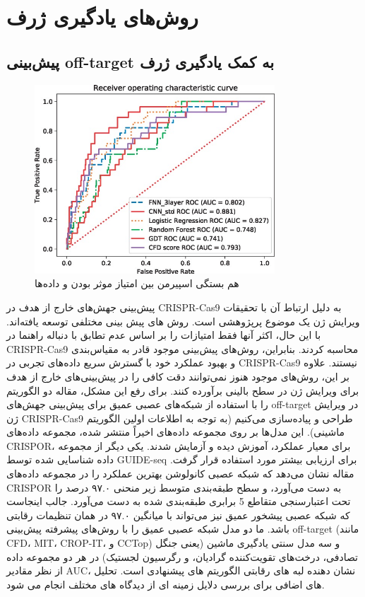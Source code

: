 \documentclass[12pt,a4paper,BCOR=.7cm,headsepline,bibliography=totoc]{report}
\begin{document}
\section{روش‌های یادگیری ژرف}
\subsection{پیش‌بینی off-target به کمک یادگیری ژرف}
\begin{figure}
\centering
\includegraphics[width=9cm, ]{pictures/DeepLearning.jpg}
\caption{
هم بستگی اسپیرمن بین امتیاز موثر بودن و داده‌ها
}\label{wrap-fig:4}
\end{figure}
پیش‌بینی جهش‌های خارج از هدف در CRISPR-Cas9 به دلیل ارتباط آن با تحقیقات ویرایش ژن یک موضوع پرپژوهشی است. روش های پیش بینی مختلفی توسعه یافته‌اند. با این حال، اکثر آنها فقط امتیازات را بر اساس عدم تطابق با دنباله راهنما در CRISPR-Cas9 محاسبه کردند. بنابراین، روش‌های پیش‌بینی موجود قادر به مقیاس‌بندی و بهبود عملکرد خود با گسترش سریع داده‌های تجربی در CRISPR-Cas9 نیستند. علاوه بر این، روش‌های موجود هنوز نمی‌توانند دقت کافی را در پیش‌بینی‌های خارج از هدف برای ویرایش ژن در سطح بالینی برآورده کنند. برای رفع این مشکل، مقاله دو الگوریتم را با استفاده از شبکه‌های عصبی عمیق برای پیش‌بینی جهش‌های off-target در ویرایش ژن CRISPR-Cas9 طراحی و پیاده‌سازی می‌کنیم (به توجه به اطلاعات اولین الگوریتم ماشینی). این مدل‌ها بر روی مجموعه داده‌های اخیراً منتشر شده، مجموعه داده‌های CRISPOR، برای معیار عملکرد، آموزش دیده و آزمایش شدند. یکی دیگر از مجموعه داده شناسایی شده توسط GUIDE-seq برای ارزیابی بیشتر مورد استفاده قرار گرفت. مقاله نشان می‌دهد که شبکه عصبی کانولوشن بهترین عملکرد را در مجموعه داده‌های CRISPOR به دست می‌آورد، و سطح طبقه‌بندی متوسط ​​زیر منحنی ۹۷.۰ درصد را تحت اعتبارسنجی متقاطع 5 برابری طبقه‌بندی شده به دست می‌آورد. جالب اینجاست که شبکه عصبی پیشخور عمیق نیز می‌تواند با میانگین ۹۷.۰ در همان تنظیمات رقابتی باشد. ما دو مدل شبکه عصبی عمیق را با روش‌های پیشرفته پیش‌بینی off-target (مانند CFD، MIT، CROP-IT، و CCTop) و سه مدل سنتی یادگیری ماشین (یعنی جنگل تصادفی، درخت‌های تقویت‌کننده گرادیان، و رگرسیون لجستیک) در هر دو مجموعه داده از نظر مقادیر AUC، نشان دهنده لبه های رقابتی الگوریتم های پیشنهادی است. تحلیل های اضافی برای بررسی دلایل زمینه ای از دیدگاه های مختلف انجام می شود.
\end{document}
